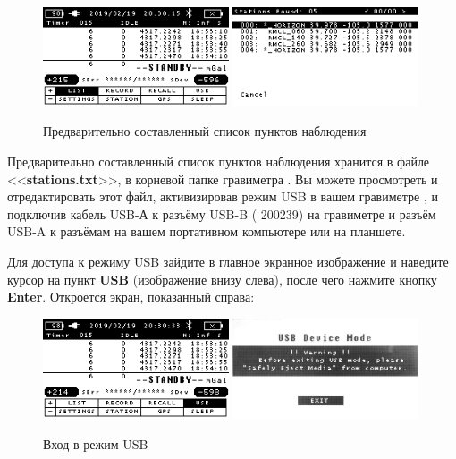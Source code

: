 \newpage
\begin{figure}[H]
  \centering
  \includegraphics[width=0.49\textwidth]{figures/pre-set_list_of_stations_1}
  \includegraphics[width=0.49\textwidth]{figures/pre-set_list_of_stations_2}
  \caption{Предварительно составленный список пунктов наблюдения}
  \label{fig:pre-set_list_of_stations}
\end{figure}

Предварительно составленный список пунктов наблюдения хранится в файле
<<\textbf{stations.txt}>>, в корневой папке гравиметра \cg{}. Вы можете
просмотреть и отредактировать этот файл, активизировав режим USB в вашем
гравиметре \cg{}, и подключив кабель USB-А к разъёму USB-B (\textnumero{} 200239)
на гравиметре \cg{} и разъём USB-A к разъёмам на вашем портативном компьютере или
на планшете.

Для доступа к режиму USB зайдите в главное экранное изображение и наведите
курсор на пункт \textbf{USB} (изображение внизу слева), после чего нажмите
кнопку \textbf{Enter}.  Откроется экран, показанный справа:

\begin{figure}[H]
  \centering
  \includegraphics[width=0.49\textwidth]{figures/entering_usb_mode_1}
  \includegraphics[width=0.49\textwidth]{figures/entering_usb_mode_2}
  \caption{Вход в режим USB}
  \label{fig:entering_usb_mode}
\end{figure}

